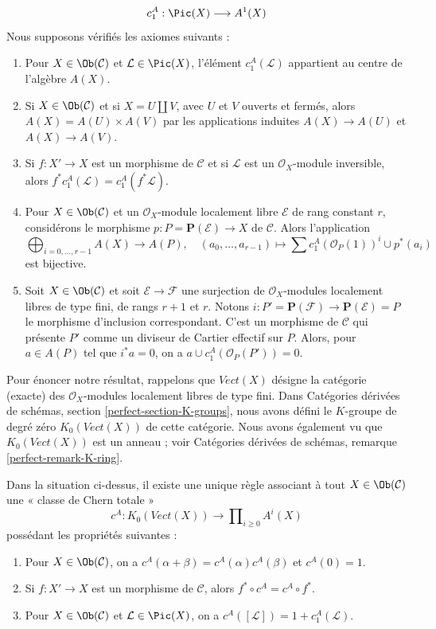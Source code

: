 $$
c_1^A : \Pic(X) \longrightarrow A^1(X)
$$
Nous supposons vérifiés les axiomes suivants :
\begin{enumerate}
\item Pour $X \in \Ob(\mathcal{C})$ et $\mathcal{L} \in \Pic(X)$,
l'élément $c_1^A(\mathcal{L})$ appartient au centre de l'algèbre $A(X)$.
\item Si $X \in \Ob(\mathcal{C})$ et si $X = U \amalg V$, avec $U$ et $V$
ouverts et fermés, alors $A(X) = A(U) \times A(V)$ par les applications induites
$A(X) \to A(U)$ et $A(X) \to A(V)$.
\item Si $f : X' \to X$ est un morphisme de $\mathcal{C}$ et si $\mathcal{L}$
est un $\mathcal{O}_X$-module inversible, alors $f^*c_1^A(\mathcal{L}) =
c_1^A(f^*\mathcal{L})$.
\item Pour $X \in \Ob(\mathcal{C})$ et un $\mathcal{O}_X$-module localement libre
$\mathcal{E}$ de rang constant $r$, considérons le morphisme
$p : P = \mathbf{P}(\mathcal{E}) \to X$ de $\mathcal{C}$.
Alors l'application
$$
\bigoplus\nolimits_{i = 0, \ldots, r - 1} A(X)
\longrightarrow A(P),\quad
(a_0, \ldots, a_{r - 1}) \longmapsto
\sum c_1^A(\mathcal{O}_P(1))^i \cup p^*(a_i)
$$
est bijective.
\item Soit $X \in \Ob(\mathcal{C})$ et soit $\mathcal{E} \to \mathcal{F}$
une surjection de $\mathcal{O}_X$-modules localement libres de type fini,
de rangs $r + 1$ et $r$. Notons
$i : P' = \mathbf{P}(\mathcal{F}) \to \mathbf{P}(\mathcal{E}) = P$
le morphisme d'inclusion correspondant. C'est un morphisme de $\mathcal{C}$
qui présente $P'$ comme un diviseur de Cartier effectif sur $P$. Alors, pour
$a \in A(P)$ tel que $i^*a = 0$, on a
$a \cup c_1^A(\mathcal{O}_P(P')) = 0$.
\end{enumerate}
Pour énoncer notre résultat, rappelons que $\textit{Vect}(X)$ désigne
la catégorie (exacte) des $\mathcal{O}_X$-modules localement libres de type fini.
Dans Catégories dérivées de schémas, section \ref{perfect-section-K-groups},
nous avons défini le $K$-groupe de degré zéro
$K_0(\textit{Vect}(X))$ de cette catégorie.
Nous avons également vu que $K_0(\textit{Vect}(X))$ est un anneau ; voir
Catégories dérivées de schémas, remarque \ref{perfect-remark-K-ring}.

\begin{proposition}
\label{proposition-chern-class}
Dans la situation ci-dessus, il existe une unique règle associant
à tout $X \in \Ob(\mathcal{C})$ une « classe de Chern totale »
$$
c^A : K_0(\textit{Vect}(X)) \longrightarrow  \prod\nolimits_{i \geq 0} A^i(X)
$$
possédant les propriétés suivantes :
\begin{enumerate}
\item Pour $X \in \Ob(\mathcal{C})$, on a
$c^A(\alpha + \beta) = c^A(\alpha) c^A(\beta)$
et $c^A(0) = 1$.
\item Si $f : X' \to X$ est un morphisme de $\mathcal{C}$, alors
$f^* \circ c^A =  c^A \circ f^*$.
\item Pour $X \in \Ob(\mathcal{C})$ et $\mathcal{L} \in \Pic(X)$,
on a $c^A([\mathcal{L}]) = 1 + c_1^A(\mathcal{L})$.
\end{enumerate}
\end{proposition}

